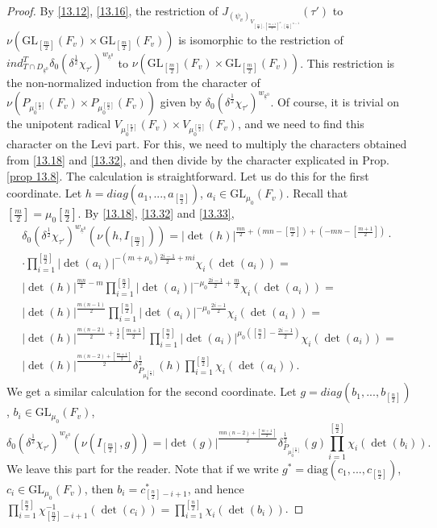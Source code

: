 \documentclass[12pts]{amsart}
\newcommand{\diag}{{\mathrm{diag}}}
\newcommand{\GL}{{\mathrm{GL}}}
\begin{document}
 \begin{proof}
 By \eqref{13.12}, \eqref{13.16}, the restriction of $J_{(\psi_v)_{V_{[\frac{m}{2}],[\frac{m+1}{2}]^n,[\frac{m}{2}]^{n-1}}}}(\tau')$ to\\
 $\nu(\GL_{[\frac{m}{2}]}(F_v)\times \GL_{[\frac{m}{2}]}(F_v))$ is isomorphic to the restriction of $ind_{T\cap D_{\underline{k}^0}}^T\delta_0(\delta^{\frac{1}{2}}\chi_{\tau'})^{w_{\underline{k}^0}}$ to $\nu(\GL_{[\frac{m}{2}]}(F_v)\times \GL_{[\frac{m}{2}]}(F_v))$. This restriction is the non-normalized induction from the character of $\nu(P_{\mu_0^{[\frac{n}{2}]}}(F_v)\times P_{\mu_0^{[\frac{n}{2}]}}(F_v))$ given by $\delta_0(\delta^{\frac{1}{2}}\chi_{\tau'})^{w_{\underline{k}^0}}$. Of course, it is trivial on the unipotent radical  $V_{\mu_0^{[\frac{n}{2}]}}(F_v)\times V_{\mu_0^{[\frac{n}{2}]}}(F_v)$, and we need to find this character on the Levi part. For this, we need to multiply the characters obtained from \eqref{13.18} and \eqref{13.32}, and then divide by the character explicated in Prop. \ref{prop 13.8}. The calculation is straightforward. Let us do this for the first coordinate. Let $h=diag(a_1,...,a_{[\frac{n}{2}]})$, $a_i\in \GL_{\mu_0}(F_v)$. Recall that $[\frac{m}{2}]=\mu_0[\frac{n}{2}]$. By \eqref{13.18}, \eqref{13.32} and \eqref{13.33},
 \begin{multline}\nonumber
  \delta_0(\delta^{\frac{1}{2}}\chi_{\tau'})^{w_{\underline{k}^0}}(\nu(h,I_{[\frac{m}{2}]}))=
  |\det(h)|^{\frac{mn}{2}+(mn-[\frac{m}{2}])+(-mn-[\frac{m+1}{2}])}\cdot\\
 \cdot  \prod_{i=1}^{[\frac{n}{2}]}|\det(a_i)|^{-(m+\mu_0)\frac{2i-1}{2}+mi}\chi_i(\det(a_i))=\\
  |\det(h)|^{\frac{mn}{2}-m}\prod_{i=1}^{[\frac{n}{2}]}|\det(a_i)|^{-\mu_0\frac{2i-1}{2}+\frac{m}{2}}\chi_i(\det(a_i))=\\
  |\det(h)|^{\frac{m(n-1)}{2}}\prod_{i=1}^{[\frac{n}{2}]}|\det(a_i)|^{-\mu_0\frac{2i-1}{2}}\chi_i(\det(a_i))=\\
  	|\det(h)|^{\frac{m(n-2)}{2}+\frac{1}{2}[\frac{m+1}{2}]}\prod_{i=1}^{[\frac{n}{2}]}|\det(a_i)|^{\mu_0([\frac{n}{2}]-\frac{2i-1}{2})}\chi_i(\det(a_i))=\\
  	|\det(h)|^{\frac{m(n-2)+[\frac{m+1}{2}]}{2}}\delta^{\frac{1}{2}}_{P_{\mu_0^{[\frac{n}{2}]}}}(h)\prod_{i=1}^{[\frac{n}{2}]}\chi_i(\det(a_i)).
  	\end{multline}
  We get a similar calculation for the second coordinate. Let $g=diag(b_1,...,b_{[\frac{n}{2}]})$, $b_i\in \GL_{\mu_0}(F_v)$,
  $$
  \delta_0(\delta^{\frac{1}{2}}\chi_{\tau'})^{w_{\underline{k}^0}}(\nu(I_{[\frac{m}{2}]},g))=
  |\det(g)|^{\frac{mn(n-2)+[\frac{m+1}{2}]}{2}}\delta^{\frac{1}{2}}_{P_{\mu_0^{[\frac{n}{2}]}}}(g)\prod_{i=1}^{[\frac{n}{2}]}\chi_i(\det(b_i)).
  $$	  
We leave this part for the reader. Note that if we write $g^*=\diag(c_1,...,c_{[\frac{n}{2}]})$, $c_i\in \GL_{\mu_0}(F_v)$, then $b_i=c^*_{[\frac{n}{2}]-i+1}$, and hence $\prod_{i=1}^{[\frac{n}{2}]}\chi^{-1}_{[\frac{n}{2}]-i+1}(\det(c_i))=\prod_{i=1}^{[\frac{n}{2}]}\chi_i(\det(b_i))$.


\end{proof}
\end{document}
